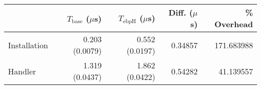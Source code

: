 \begin{tabular}{>{\ttfamily}lrrrr}
\toprule
\multicolumn{1}{l}{Type} & $T_\text{base}$ ($\mu$s) & $T_\text{ebpH}$ ($\mu$s) &  Diff. ($\mu$s) &  \% Overhead \\
\midrule
            Installation &           0.203 (0.0079) &           0.552 (0.0197) &         0.34857 &   171.683988 \\
                 Handler &           1.319 (0.0437) &           1.862 (0.0422) &         0.54282 &    41.139557 \\
\bottomrule
\end{tabular}
